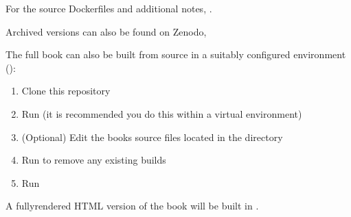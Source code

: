 \documentclass[letterpaper,table,10pt,english]{jupyterBook}
\begin{document}
\sphinxAtStartPar
For the source Dockerfiles and additional notes, .

\sphinxAtStartPar
Archived versions can also be found on Zenodo, 

\begin{DUlineblock}{0em}
\item[] 
\end{DUlineblock}

\sphinxAtStartPar
The full book can also be built from source in a suitably configured environment ():
\begin{enumerate}
%
\item {} 
\sphinxAtStartPar
Clone this repository

\item {} 
\sphinxAtStartPar
Run  (it is recommended you do this within a virtual environment)

\item {} 
\sphinxAtStartPar
(Optional) Edit the books source files located in the  directory

\item {} 
\sphinxAtStartPar
Run  to remove any existing builds

\item {} 
\sphinxAtStartPar
Run 

\end{enumerate}

\sphinxAtStartPar
A fully\sphinxhyphen{}rendered HTML version of the book will be built in .

\begin{DUlineblock}{0em}
\item[] 
\end{DUlineblock}
\end{document}
